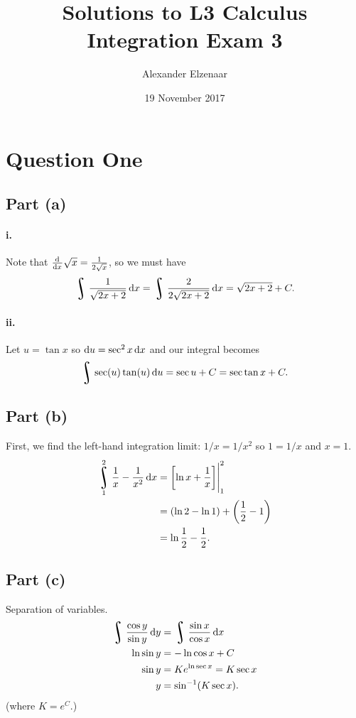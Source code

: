 \documentclass[a4paper]{report}
\title{Solutions to L3 Calculus Integration Exam 3}
\author{Alexander Elzenaar}
\date{19 November 2017}
\DeclareMathOperator*{\rint}{\scalerel*{\rotatebox{17}{$\!\int\!$}}{\int}}
\begin{document}
\maketitle

\section*{Question One}
\subsection*{Part (a)}
\paragraph{i.}
Note that $ \od{}{x} \sqrt{x} = \frac{1}{2\sqrt{x}} $, so we must have
\begin{displaymath}
  \rint \frac{1}{\sqrt{2x + 2}} \dif{x} = \rint \frac{2}{2\sqrt{2x + 2}} \dif{x} = \sqrt{2x + 2} + C.
\end{displaymath}

\paragraph{ii.}
Let $ u = \tan x $ so $ \dif{u} = \sec^2 x \dif{x} $ and our integral becomes
\begin{displaymath}
  \rint \sec(u) \tan(u) \dif{u} = \sec u + C = \sec \tan x + C.
\end{displaymath}

\subsection*{Part (b)}
First, we find the left-hand integration limit: $ 1/x = 1/x^2 $ so $ 1 = 1/x $ and $ x = 1 $.
\begin{align*}
  \rint_1^2 \frac{1}{x} - \frac{1}{x^2} \dif{x} &= \eval{\left[\ln x + \frac{1}{x}\right]}_1^2\\
                                                &= (\ln 2 - \ln 1) + \left(\frac{1}{2} - 1\right)\\
                                                &= \ln \frac{1}{2} - \frac{1}{2}.
\end{align*}

\subsection*{Part (c)}
Separation of variables.
\begin{align*}
  \rint \frac{\cos y}{\sin y} \dif{y} &= \rint \frac{\sin x}{\cos x} \dif{x}\\
  \ln\sin y &= -\ln\cos x + C\\
  \sin y &= Ke^{\ln\sec x} = K\sec x\\
  y &= \sin^{-1} (K\sec x).
\end{align*}
(where $ K = e^C $.)
\end{document}
